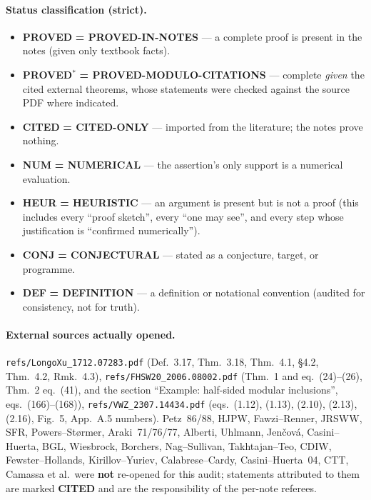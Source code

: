 \documentclass[11pt]{article}
\newcommand{\stPR}{{\color{okgreen}\textsf{\scriptsize\bfseries PROVED}}}
\newcommand{\stPMC}{{\color{teal}\textsf{\scriptsize\bfseries PROVED$^\ast$}}}
\newcommand{\stCIT}{{\color{navy}\textsf{\scriptsize\bfseries CITED}}}
\newcommand{\stNUM}{{\color{orange!80!black}\textsf{\scriptsize\bfseries NUM}}}
\newcommand{\stHEU}{{\color{warn}\textsf{\scriptsize\bfseries HEUR}}}
\newcommand{\stCON}{{\color{warn}\textsf{\scriptsize\bfseries CONJ}}}
\newcommand{\stDEF}{{\textsf{\scriptsize\bfseries DEF}}}
\begin{document}
\paragraph{Status classification (strict).}
\begin{itemize}[leftmargin=1.4em]
\item \stPR{} \textbf{= PROVED-IN-NOTES} --- a complete proof is present in the notes (given only textbook facts).
\item \stPMC{} \textbf{= PROVED-MODULO-CITATIONS} --- complete \emph{given} the cited external theorems, whose statements were checked against the source PDF where indicated.
\item \stCIT{} \textbf{= CITED-ONLY} --- imported from the literature; the notes prove nothing.
\item \stNUM{} \textbf{= NUMERICAL} --- the assertion's only support is a numerical evaluation.
\item \stHEU{} \textbf{= HEURISTIC} --- an argument is present but is not a proof (this includes every ``proof sketch'', every ``one may see'', and every step whose justification is ``confirmed numerically'').
\item \stCON{} \textbf{= CONJECTURAL} --- stated as a conjecture, target, or programme.
\item \stDEF{} \textbf{= DEFINITION} --- a definition or notational convention (audited for consistency, not for truth).
\end{itemize}

\paragraph{External sources actually opened.}
\texttt{refs/LongoXu\_1712.07283.pdf} (Def.~3.17, Thm.~3.18, Thm.~4.1, \S4.2, Thm.~4.2, Rmk.~4.3),
\texttt{refs/FHSW20\_2006.08002.pdf} (Thm.~1 and eq.~(24)--(26), Thm.~2 eq.~(41), and the section
``Example: half-sided modular inclusions'', eqs.~(166)--(168)),
\texttt{refs/VWZ\_2307.14434.pdf} (eqs.~(1.12), (1.13), (2.10), (2.13), (2.16), Fig.~5, App.~A.5 numbers).
Petz~86/88, HJPW, Fawzi--Renner, JRSWW, SFR, Powers--St\o rmer, Araki~71/76/77, Alberti, Uhlmann, Jen\v cov\'a,
Casini--Huerta, BGL, Wiesbrock, Borchers, Nag--Sullivan, Takhtajan--Teo, CDIW, Fewster--Hollands,
Kirillov--Yuriev, Calabrese--Cardy, Casini--Huerta~04, CTT, Camassa et al.\ were \textbf{not} re-opened for this
audit; statements attributed to them are marked \stCIT{} and are the responsibility of the per-note referees.
\end{document}
